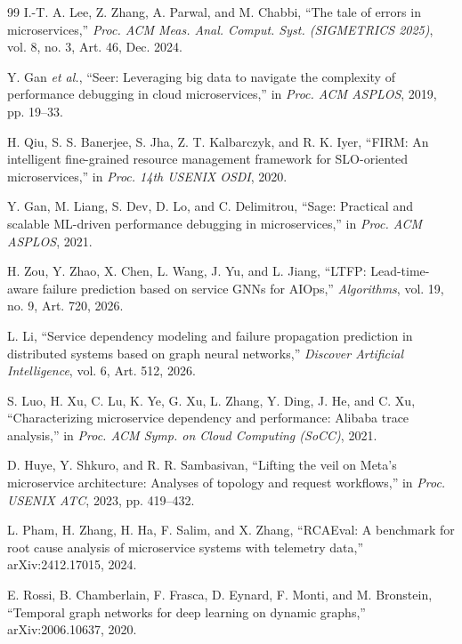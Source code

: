 \documentclass[conference,a4paper]{IEEEtran}
\begin{document}
\begin{thebibliography}{99}
 I.-T. A. Lee, Z. Zhang, A. Parwal, and M. Chabbi, ``The tale of errors in microservices,'' \emph{Proc. ACM Meas. Anal. Comput. Syst. (SIGMETRICS 2025)}, vol. 8, no. 3, Art. 46, Dec. 2024.

 Y. Gan \emph{et al.}, ``Seer: Leveraging big data to navigate the complexity of performance debugging in cloud microservices,'' in \emph{Proc. ACM ASPLOS}, 2019, pp. 19--33.

 H. Qiu, S. S. Banerjee, S. Jha, Z. T. Kalbarczyk, and R. K. Iyer, ``FIRM: An intelligent fine-grained resource management framework for SLO-oriented microservices,'' in \emph{Proc. 14th USENIX OSDI}, 2020.

 Y. Gan, M. Liang, S. Dev, D. Lo, and C. Delimitrou, ``Sage: Practical and scalable ML-driven performance debugging in microservices,'' in \emph{Proc. ACM ASPLOS}, 2021.

 H. Zou, Y. Zhao, X. Chen, L. Wang, J. Yu, and L. Jiang, ``LTFP: Lead-time-aware failure prediction based on service GNNs for AIOps,'' \emph{Algorithms}, vol. 19, no. 9, Art. 720, 2026.

 L. Li, ``Service dependency modeling and failure propagation prediction in distributed systems based on graph neural networks,'' \emph{Discover Artificial Intelligence}, vol. 6, Art. 512, 2026.

 S. Luo, H. Xu, C. Lu, K. Ye, G. Xu, L. Zhang, Y. Ding, J. He, and C. Xu, ``Characterizing microservice dependency and performance: Alibaba trace analysis,'' in \emph{Proc. ACM Symp. on Cloud Computing (SoCC)}, 2021.

 D. Huye, Y. Shkuro, and R. R. Sambasivan, ``Lifting the veil on Meta's microservice architecture: Analyses of topology and request workflows,'' in \emph{Proc. USENIX ATC}, 2023, pp. 419--432.

 L. Pham, H. Zhang, H. Ha, F. Salim, and X. Zhang, ``RCAEval: A benchmark for root cause analysis of microservice systems with telemetry data,'' arXiv:2412.17015, 2024.

 E. Rossi, B. Chamberlain, F. Frasca, D. Eynard, F. Monti, and M. Bronstein, ``Temporal graph networks for deep learning on dynamic graphs,'' arXiv:2006.10637, 2020.

\end{thebibliography}
\end{document}

